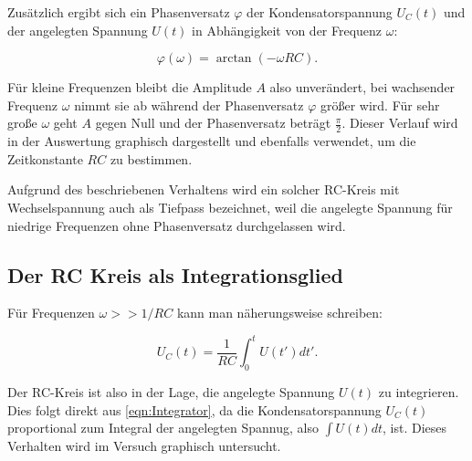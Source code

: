 Zusätzlich ergibt sich ein Phasenversatz $\varphi$ der Kondensatorspannung $U_{C}(t)$ und der angelegten Spannung $U(t)$
in Abhängigkeit von der Frequenz $\omega$:

\begin{equation}
    \varphi (\omega )=\arctan (-\omega RC). \label{eqn:Phasenversatz}
\end{equation}

Für kleine Frequenzen bleibt die Amplitude $A$ also unverändert, bei wachsender Frequenz $\omega$ nimmt sie ab während
der Phasenversatz $\varphi$ größer wird. Für sehr große $\omega$ geht $A$ gegen Null und der Phasenversatz beträgt $\frac{\pi}{2}$.
Dieser Verlauf wird in der Auswertung graphisch dargestellt und ebenfalls verwendet, um die Zeitkonstante $RC$ zu bestimmen.

Aufgrund des beschriebenen Verhaltens wird ein solcher RC-Kreis mit Wechselspannung auch als Tiefpass bezeichnet, weil die angelegte
Spannung für niedrige Frequenzen ohne Phasenversatz durchgelassen wird.

\subsection{Der RC Kreis als Integrationsglied}
Für Frequenzen $\omega >> 1/RC$ kann man näherungsweise schreiben:

\begin{equation}
    U_{C}(t) = \frac{1}{RC}\int_{0}^{t}U({t}')d{t}'. \label{eqn:Integrator}
\end{equation}

Der RC-Kreis ist also in der Lage, die angelegte Spannung $U(t)$ zu integrieren. Dies folgt direkt aus \ref{eqn:Integrator},
da die Kondensatorspannung $U_{C}(t)$ proportional zum Integral der angelegten Spannug, also $\int U(t)dt$, ist.
Dieses Verhalten wird im Versuch graphisch untersucht.
